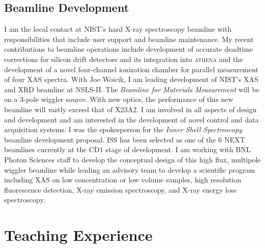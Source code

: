 \documentclass[11pt]{moderncv}
\begin{document}
\subsection{Beamline Development}
%
{I am the local contact at NIST's hard X-ray spectroscopy beamline
  with responsibilities that include user support and beamline
  maintenance.  My recent contributions to beamline operations include
  development of accurate deadtime corrections for silicon drift
  detectors and its integration into \textsc{athena} and the
  development of a novel four-channel ionization chamber for parallel
  measurement of four XAS spectra.}
%
%
{With Joe Woicik, I am leading development of NIST's XAS and XRD
  beamline at NSLS-II.  The \textit{Beamline for Materials
    Measurement} will be on a 3-pole wiggler source.  With new optics,
  the performance of this new beamline will vastly exceed that of
  X23A2.  I am involved in all aspects of design and development and
  am interested in the development of novel control and data
  acquisition systems.}
%
%
{I was the spokesperson for the \textit{Inner Shell Spectroscopy}
  beamline development proposal.  ISS has been selected as one of the
  6 NEXT beamlines currently at the CD1 stage of development.  I am
  working with BNL Photon Sciences staff to develop the conceptual
  design of this high flux, multipole wiggler beamline while leading
  an advisory team to develop a scientific program including XAS on
  low concentration or low volume samples, high resolution
  fluorescence detection, X-ray emission spectroscopy, and X-ray
  energy loss spectroscopy.}



\section{Teaching Experience}
\end{document}
